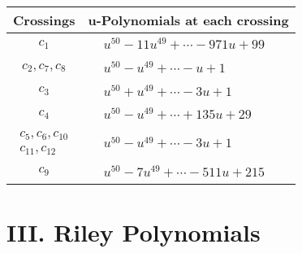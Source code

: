 \documentclass[1p]{elsarticle_modified}
\theoremstyle{definition}
\begin{document}
\begin{tabular}{m{50pt}|m{274pt}}
Crossings & \hspace{64pt}u-Polynomials at each crossing \\
\hline $$\begin{aligned}c_{1}\end{aligned}$$&$\begin{aligned}
&u^{50}-11 u^{49}+\cdots-971 u+99
\end{aligned}$\\
\hline $$\begin{aligned}c_{2},c_{7},c_{8}\end{aligned}$$&$\begin{aligned}
&u^{50}- u^{49}+\cdots- u+1
\end{aligned}$\\
\hline $$\begin{aligned}c_{3}\end{aligned}$$&$\begin{aligned}
&u^{50}+u^{49}+\cdots-3 u+1
\end{aligned}$\\
\hline $$\begin{aligned}c_{4}\end{aligned}$$&$\begin{aligned}
&u^{50}- u^{49}+\cdots+135 u+29
\end{aligned}$\\
\hline $$\begin{aligned}c_{5},c_{6},c_{10}\\c_{11},c_{12}\end{aligned}$$&$\begin{aligned}
&u^{50}- u^{49}+\cdots-3 u+1
\end{aligned}$\\
\hline $$\begin{aligned}c_{9}\end{aligned}$$&$\begin{aligned}
&u^{50}-7 u^{49}+\cdots-511 u+215
\end{aligned}$\\
\hline
\end{tabular}\newpage\renewcommand{\arraystretch}{1}
\centering \section*{ III. Riley Polynomials}
\end{document}
